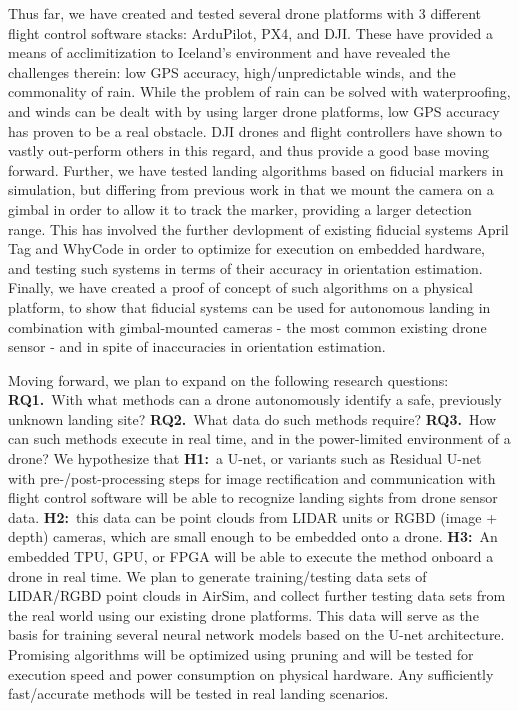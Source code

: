 Thus far, we have created and tested several drone platforms with 3 different flight control software stacks: ArduPilot, PX4, and DJI.
These have provided a means of acclimitization to Iceland's environment and have revealed the challenges therein: low GPS accuracy, high/unpredictable winds, and the commonality of rain.
While the problem of rain can be solved with waterproofing, and winds can be dealt with by using larger drone platforms, low GPS accuracy has proven to be a real obstacle.
DJI drones and flight controllers have shown to vastly out-perform others in this regard, and thus provide a good base moving forward.
Further, we have tested landing algorithms based on fiducial markers in simulation, but differing from previous work in that we mount the camera on a gimbal in order to allow it to track the marker, providing a larger detection range.
This has involved the further devlopment of existing fiducial systems April Tag and WhyCode in order to optimize for execution on embedded hardware, and testing such systems in terms of their accuracy in orientation estimation.
Finally, we have created a proof of concept of such algorithms on a physical platform, to show that fiducial systems can be used for autonomous landing in combination with gimbal-mounted cameras - the most common existing drone sensor - and in spite of inaccuracies in orientation estimation.

Moving forward, we plan to expand on the following research questions:
\textbf{RQ1.}~With what methods can a drone autonomously identify a safe, previously unknown landing site?
\textbf{RQ2.}~What data do such methods require?
\textbf{RQ3.}~How can such methods execute in real time, and in the power-limited environment of a drone?
We hypothesize that
\textbf{H1:}~a U-net, or variants such as Residual U-net with pre-/post-processing steps for image rectification and communication with flight control software will be able to recognize landing sights from drone sensor data.
\textbf{H2:}~this data can be point clouds from LIDAR units or RGBD (image + depth) cameras, which are small enough to be embedded onto a drone.
\textbf{H3:}~An embedded TPU, GPU, or FPGA will be able to execute the method onboard a drone in real time.
We plan to generate training/testing data sets of LIDAR/RGBD point clouds in AirSim,
and collect further testing data sets from the real world using our existing drone platforms.
This data will serve as the basis for training several neural network models based on the U-net architecture.
Promising algorithms will be optimized using pruning and will be tested for execution speed and power consumption on physical hardware.
Any sufficiently fast/accurate methods will be tested in real landing scenarios.

\newpage
